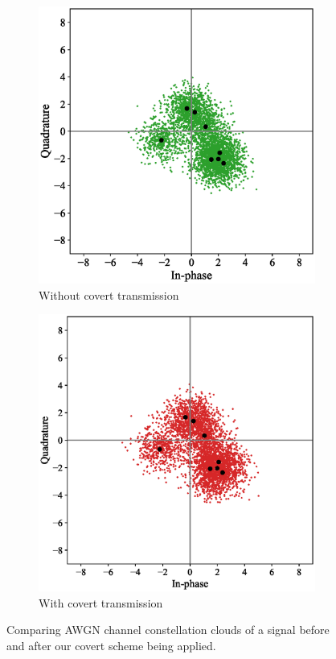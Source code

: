 \begin{figure}[bp!]
	\begin{subfigure}{0.24\textwidth}
		\includegraphics[width=\linewidth]{figs/awgn_normal_constellation}
		\caption{Without covert transmission}
	\end{subfigure}
	\hfill
	\begin{subfigure}{0.24\textwidth}
		\includegraphics[width=\linewidth]{figs/awgn_covert_constellation}
		\caption{With covert transmission}	
	\end{subfigure}
	\caption{Comparing AWGN channel constellation clouds of a signal before and after our covert scheme being applied.}
	\label{fig:awgn_constellation}
\end{figure}

